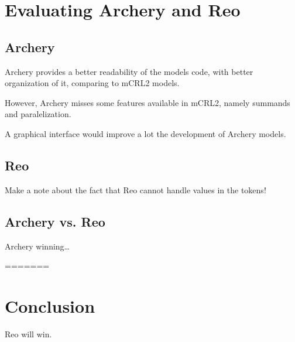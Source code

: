 \documentclass[a4paper]{article}
\newcommand{\ar}{Archery\xspace}
\newcommand{\re}{Reo\xspace}
\newcommand{\mcrl}{mCRL2\xspace}
\begin{document}
%
%
\section{Evaluating \ar and \re}

\subsection{\ar}

\ar provides a better readability of the models code, with better organization of it,
comparing to \mcrl models.

However, \ar misses some features available in \mcrl, namely summands and paralelization.

A graphical interface would improve a lot the development of Archery models.

\subsection{\re}

Make a note about the fact that \re cannot handle values in the tokens!

\subsection{\ar vs. \re}

\ar winning\dots

%
%
=======


\section{Conclusion}

\re will win. 
\end{document}
